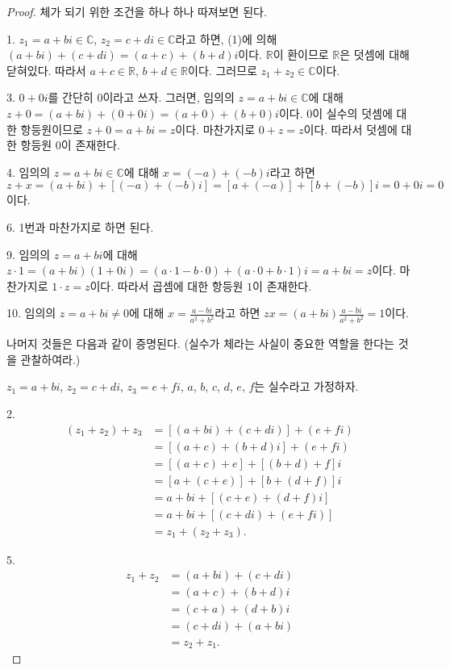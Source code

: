 \documentclass{article}
\begin{document}
\begin{proof}
체가 되기 위한 조건을 하나 하나 따져보면 된다.

1. \(z_1=a+bi\in\mathbb C\), \(z_2=c+di\in\mathbb C\)라고 하면, (1)에 의해 \((a+bi)+(c+di)=(a+c)+(b+d)i\)이다.
\(\mathbb R\)이 환이므로 \(\mathbb R\)은 덧셈에 대해 닫혀있다.
따라서 \(a+c\in\mathbb R\), \(b+d\in\mathbb R\)이다.
그러므로 \(z_1+z_2\in\mathbb C\)이다.

3. \(0+0i\)를 간단히 \(0\)이라고 쓰자.
그러면, 임의의 \(z=a+bi\in\mathbb C\)에 대해 \(z+0=(a+bi)+(0+0i)=(a+0)+(b+0)i\)이다.
\(0\)이 실수의 덧셈에 대한 항등원이므로 \(z+0=a+bi=z\)이다.
마찬가지로 \(0+z=z\)이다.
따라서 덧셈에 대한 항등원 \(0\)이 존재한다.

4. 임의의 \(z=a+bi\in\mathbb C\)에 대해 \(x=(-a)+(-b)i\)라고 하면 \(z+x=(a+bi)+[(-a)+(-b)i]=[a+(-a)]+[b+(-b)]i=0+0i=0\)이다.

6. 1번과 마찬가지로 하면 된다.

9. 임의의 \(z=a+bi\)에 대해 \(z\cdot1=(a+bi)(1+0i)=(a\cdot1-b\cdot0)+(a\cdot0+b\cdot1)i=a+bi=z\)이다.
마찬가지로 \(1\cdot z=z\)이다.
따라서 곱셈에 대한 항등원 \(1\)이 존재한다.

10. 임의의 \(z=a+bi\neq0\)에 대해 \(x=\frac{a-bi}{a^2+b^2}\)라고 하면 \(zx=(a+bi)\frac{a-bi}{a^2+b^2}=1\)이다.

나머지 것들은 다음과 같이 증명된다.
(실수가 체라는 사실이 중요한 역할을 한다는 것을 관찰하여라.)

\(z_1=a+bi\), \(z_2=c+di\), \(z_3=e+fi\), \(a\), \(b\), \(c\), \(d\), \(e\), \(f\)는 실수라고 가정하자.

2.
\begin{align*}
(z_1+z_2)+z_3
&=[(a+bi)+(c+di)]+(e+fi)\\
&=[(a+c)+(b+d)i]+(e+fi)\\
&=[(a+c)+e]+[(b+d)+f]i\\
&=[a+(c+e)]+[b+(d+f)]i\\
&=a+bi+[(c+e)+(d+f)i]\\
&=a+bi+[(c+di)+(e+fi)]\\
&=z_1+(z_2+z_3).
\end{align*}

5.
\begin{align*}
z_1+z_2
&=(a+bi)+(c+di)\\
&=(a+c)+(b+d)i\\
&=(c+a)+(d+b)i\\
&=(c+di)+(a+bi)\\
&=z_2+z_1.
\end{align*}


\end{proof}
\end{document}
